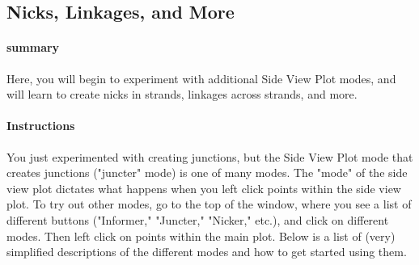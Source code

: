 \documentclass[
titlepage,
fontsize=12pt
]{article}
\begin{document}
	\subsection{Nicks, Linkages, and More}
	
	\paragraph{summary}
	Here, you will begin to experiment with additional Side View Plot modes, and will learn to create nicks in strands, linkages across strands, and more.
	\paragraph{Instructions}
	
	You just experimented with creating junctions, but the Side View Plot mode that creates junctions ("juncter" mode) is one of many modes. The "mode" of the side view plot dictates what happens when you left click points within the side view plot. To try out other modes, go to the top of the window, where you see a list of different buttons ("Informer," "Juncter," "Nicker," etc.), and click on different modes. Then left click on points within the main plot. Below is a list of (very) simplified descriptions of the different modes and how to get started using them.
	
\end{document}
